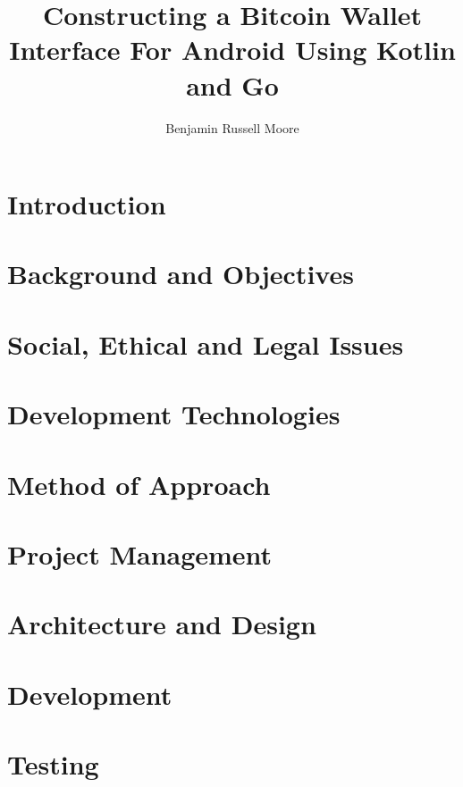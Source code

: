 \documentclass{article}
\title{Constructing a Bitcoin Wallet Interface For Android Using Kotlin and Go}
\author{Benjamin Russell Moore}
\date{ }
\begin{document}
\maketitle

\newpage

\tableofcontents

\newpage



\section{Introduction}

\section{Background and Objectives}

\section{Social, Ethical and Legal Issues}

\section{Development Technologies}

\section{Method of Approach}

\section{Project Management}

\section{Architecture and Design}

\section{Development}

\section{Testing}
\end{document}
